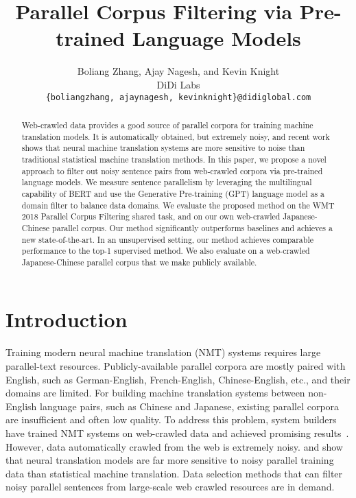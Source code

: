 \documentclass[11pt,a4paper]{article}
\title{Parallel Corpus Filtering via Pre-trained Language Models}
\author{Boliang Zhang, Ajay Nagesh, and Kevin Knight \\
	    DiDi Labs \\
        {\tt \{boliangzhang, ajaynagesh, kevinknight\}@didiglobal.com}\\
        }
\date{}
\begin{document}
\maketitle
\begin{abstract}

Web-crawled data provides a good source of parallel corpora for training machine translation models. It is automatically obtained, but extremely noisy, and recent work shows that neural machine translation systems are more sensitive to noise than traditional statistical machine translation methods. In this paper, we propose a novel approach to filter out noisy sentence pairs from web-crawled corpora via pre-trained language models. We measure sentence parallelism by leveraging the multilingual capability of BERT and use the Generative Pre-training (GPT) language model as a domain filter to balance data domains.
We evaluate the proposed method on the WMT 2018 Parallel Corpus Filtering shared task, and on our own web-crawled Japanese-Chinese parallel corpus. Our method significantly outperforms baselines and achieves a new state-of-the-art. In an unsupervised setting, our method achieves comparable performance to the top-1 supervised method.
We also evaluate on a web-crawled Japanese-Chinese parallel corpus that we make publicly available.





\end{abstract}
 \section{Introduction}

Training modern neural machine translation (NMT) systems requires large parallel-text resources. Publicly-available parallel corpora are mostly paired with English, such as German-English, French-English, Chinese-English, etc., and their domains are limited. 
For building machine translation systems between non-English language pairs, such as Chinese and Japanese, existing parallel corpora are insufficient and often low quality. To address this problem, system builders have trained NMT systems on web-crawled data and achieved promising results~\citep{xu2017zipporah,junczys2018dual,schwenk2018filtering,schwenk2019wikimatrix}. However, data automatically crawled from the web is extremely noisy. \citet{khayrallah2018impact} and \citet{belinkov2017synthetic} show that neural translation models are far more sensitive to noisy parallel training data than statistical machine translation. Data selection methods that can filter noisy parallel sentences from large-scale web crawled resources are in demand.
\end{document}
